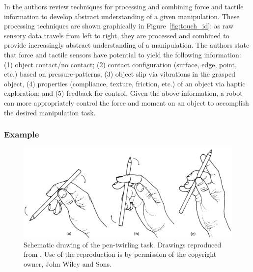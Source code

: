 In \cite{cutkosky2008force} the authors review techniques for processing and combining force and tactile information to develop abstract understanding of a given manipulation.
These processing techniques are shown graphically in Figure~\ref{fig:touch_id}: as raw sensory data travels from left to right, they are processed and combined to provide increasingly abstract understanding of a manipulation.
The authors state that force and tactile sensors have potential to yield the following information:
(1) object contact/no contact; 
(2) contact configuration (surface, edge, point, etc.) based on pressure-patterns; 
(3) object slip via vibrations in the grasped object, 
(4) properties (compliance, texture, friction, etc.) of an object via haptic exploration; and 
(5) feedback for control.
Given the above information, a robot can more appropriately control the force and moment on an object to accomplish the desired manipulation task.


\subsubsection*{Example}

\begin{figure}[]
	\centering
	\includegraphics[width=\linewidth]{images/pen_twirling}
	\caption{Schematic drawing of the pen-twirling task. Drawings reproduced from \cite{elliott1984classification}. Use of the reproduction is by permission of the copyright owner, John Wiley and Sons.}
	\label{fig:pen_twirling}
\end{figure}

